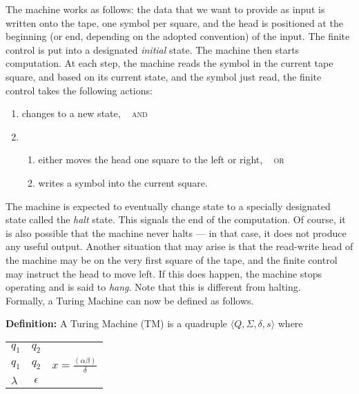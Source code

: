 \documentclass[12pt]{article}
\begin{document}
\bskip


The machine works as follows: the data  that we want to provide as input is
written onto the tape, one symbol per square, and the head is positioned at
the beginning (or  end, depending on the adopted  convention) of the input.
The  finite control  is put  into  a designated  \emph{initial} state.  The
machine then starts computation. At each step, the machine reads the symbol
in  the current tape  square, and based on its current state, and the
symbol just read, the finite control takes  the following actions:
\begin{enumerate}
\item changes to a new state, ~ \textsc{and}
\item 
  \begin{enumerate}
  \item either moves the head one square to the left or right, ~ \textsc{or}
  \item writes a symbol into the current square.
  \end{enumerate}
\end{enumerate}
The  machine  is  expected  to  eventually  change  state  to  a  specially
designated state called the \emph{halt}  state. This signals the end of the
computation. Of  course, it is also  possible that the  machine never halts
--- in that case, it does  not produce any useful output. Another situation
that may  arise is that the  read-write head of  the machine may be  on the
very first square of the tape, and the finite control may instruct the head
to move left.  If this does happen, the machine stops operating and is said
to \emph{hang}. Note that this is different from halting. \\
Formally, a Turing Machine can now be defined as follows.

\begin{center}
  \begin{minipage}{0.85\textwidth}
\textbf{Definition:}  A Turing  Machine  (TM) is  a  quadruple $\langle Q,  \Sigma , \delta , s  \rangle $ where \\
\begin{tabular}{l c l}
$q_1$ & $q_2$ \\
       $q_1$ & $q_2$ & $ x= \frac{(\alpha \beta)}{\delta}$ \\
       $\lambda$ & $\epsilon$  \\
\end{tabular}
  \end{minipage}
\end{center}
\end{document}
